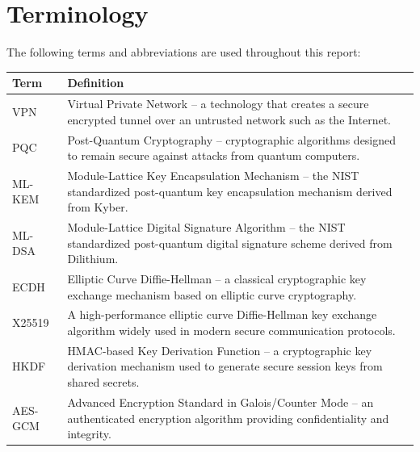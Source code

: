 
\section{Terminology}

The following terms and abbreviations are used throughout this report:

\begin{table}[H]
\centering
\begin{tabular}{|l|p{10cm}|}
\hline
\textbf{Term} & \textbf{Definition} \\ \hline

VPN & Virtual Private Network -- a technology that creates a secure encrypted tunnel over an untrusted network such as the Internet. \\ \hline

PQC & Post-Quantum Cryptography -- cryptographic algorithms designed to remain secure against attacks from quantum computers. \\ \hline

ML-KEM & Module-Lattice Key Encapsulation Mechanism -- the NIST standardized post-quantum key encapsulation mechanism derived from Kyber. \\ \hline

ML-DSA & Module-Lattice Digital Signature Algorithm -- the NIST standardized post-quantum digital signature scheme derived from Dilithium. \\ \hline

ECDH & Elliptic Curve Diffie-Hellman -- a classical cryptographic key exchange mechanism based on elliptic curve cryptography. \\ \hline

X25519 & A high-performance elliptic curve Diffie-Hellman key exchange algorithm widely used in modern secure communication protocols. \\ \hline

HKDF & HMAC-based Key Derivation Function -- a cryptographic key derivation mechanism used to generate secure session keys from shared secrets. \\ \hline

AES-GCM & Advanced Encryption Standard in Galois/Counter Mode -- an authenticated encryption algorithm providing confidentiality and integrity. \\ \hline


\end{tabular}
\end{table}
